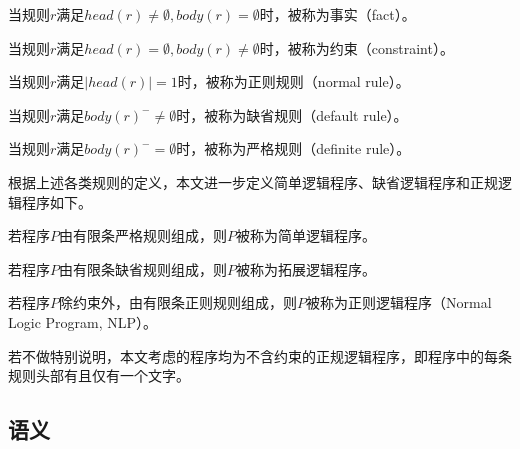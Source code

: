 \begin{definition}[事实]
当规则$r$满足$head(r)\neq \emptyset, body(r) = \emptyset$时，被称为事实（fact）。\label{def:fact}
\end{definition}
\begin{definition}[约束]
当规则$r$满足$head(r)= \emptyset, body(r) \neq \emptyset$时，被称为约束（constraint）。
\end{definition}
\begin{definition}[正则规则]
    当规则$r$满足$|head(r)|=1$时，被称为正则规则（normal rule）。
\end{definition}
\begin{definition}[缺省规则]
    当规则$r$满足$body(r)^-\neq \emptyset$时，被称为缺省规则（default rule）。
\end{definition}
\begin{definition}[严格规则]
    当规则$r$满足$body(r)^- = \emptyset$时，被称为严格规则（definite rule）。\label{def:definite_rule}
\end{definition}
根据上述各类规则的定义，本文进一步定义简单逻辑程序、缺省逻辑程序和正规逻辑程序如下。
\begin{definition}[简单逻辑程序]
    若程序$P$由有限条严格规则组成，则$P$被称为简单逻辑程序。
\end{definition}
\begin{definition}[拓展逻辑程序]
    若程序$P$由有限条缺省规则组成，则$P$被称为拓展逻辑程序。
\end{definition}
\begin{definition}[正则逻辑程序]
    若程序$P$除约束外，由有限条正则规则组成，则$P$被称为正则逻辑程序（Normal Logic Program, NLP）。
\end{definition}
若不做特别说明，本文考虑的程序均为不含约束的正规逻辑程序，即程序中的每条规则头部有且仅有一个文字。
\subsection{语义}
